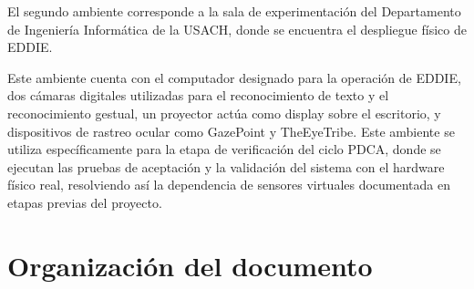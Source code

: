 El segundo ambiente corresponde a la sala de experimentación del Departamento de Ingeniería Informática de la USACH, donde se encuentra el despliegue físico de EDDIE.

Este ambiente cuenta con el computador designado para la operación de EDDIE, dos cámaras digitales utilizadas para el reconocimiento de texto y el reconocimiento gestual, un proyector actúa como display sobre el escritorio, y dispositivos de rastreo ocular como GazePoint y TheEyeTribe. Este ambiente se utiliza específicamente para la etapa de verificación del ciclo PDCA, donde se ejecutan las pruebas de aceptación y la validación del sistema con el hardware físico real, resolviendo así la dependencia de sensores virtuales documentada en etapas previas del proyecto.

\section{Organizaci\'on del documento}
\label{intro:organizacion}



